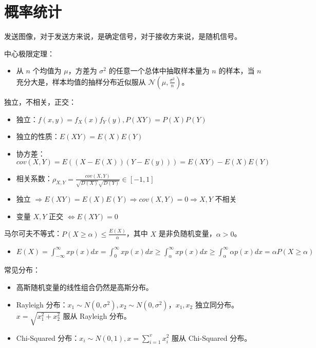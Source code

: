 \section{概率统计}
\begin{remark}
    发送图像，对于发送方来说，是确定信号，对于接收方来说，是随机信号。
\end{remark}

\begin{remark}
    中心极限定理：
    \begin{itemize}
        \item 从 $n$ 个均值为 $\mu$，方差为 $\sigma^2$ 的任意一个总体中抽取样本量为 $n$ 的样本，当 $n$ 充分大是，样本均值的抽样分布近似服从 $\mathcal{N}(\mu, \frac{\sigma^2}{n})$。
    \end{itemize}
\end{remark}

\begin{remark}
    独立，不相关，正交：
    \begin{itemize}
        \item 独立：$f(x, y) = f_X(x)f_Y(y), P(XY) = P(X)P(Y)$
        \item 独立的性质：$E(XY) = E(X)E(Y)$
        \item 协方差：$cov(X, Y) = E((X - E(X))(Y - E(y))) = E(XY) - E(X)E(Y)$
        \item 相关系数：$\rho_{X, Y} = \frac{cov(X, Y)}{\sqrt{D(X)}\sqrt{D(Y)}} \in \left[-1, 1\right]$
        \item 独立 $\Rightarrow E(XY) = E(X)E(Y) \Rightarrow cov(X, Y) = 0 \Rightarrow X, Y$ 不相关 
        \item 变量 $X,Y$ 正交 $\Leftrightarrow E(XY) = 0$
    \end{itemize}
\end{remark}

\begin{remark}
    马尔可夫不等式：$P(X \ge \alpha) \le \frac{E(X)}{\alpha}$，其中 $X$ 是非负随机变量，$\alpha > 0$。 
    \begin{itemize}
        \item $E(X) = \int_{-\infty}^{\infty}xp(x)dx = \int_{0}^{\infty}xp(x)dx \ge \int_{\alpha}^{\infty}xp(x)dx \ge \int_{\alpha}^{\infty}\alpha p(x)dx = \alpha P(X \ge \alpha)$
    \end{itemize}
\end{remark}

\begin{remark}
    常见分布：
    \begin{itemize}
        \item 高斯随机变量的线性组合仍然是高斯分布。
        \item Rayleigh 分布：$x_1\sim N(0, \sigma^2), x_2\sim N(0, \sigma^2)$，$x_1,x_2$ 独立同分布。$x = \sqrt{x_1^2 + x_2^2}$ 服从 Rayleigh 分布。   
        \item Chi-Squared 分布：$x_i\sim N(0, 1), x = \sum_{i = 1}^{v} x_i^2$ 服从 Chi-Squared 分布。
    \end{itemize}
\end{remark}

